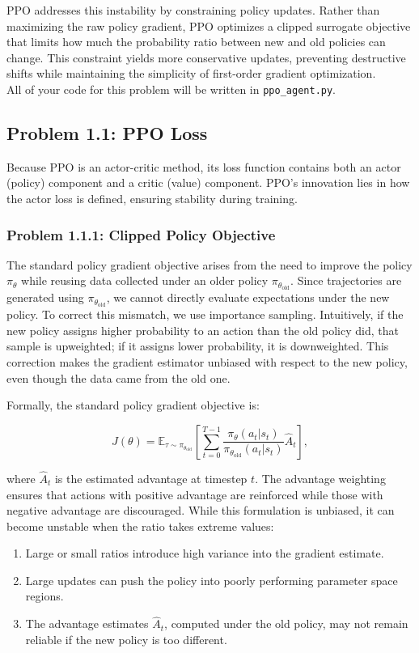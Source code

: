 \documentclass[12pt]{article}
\begin{document}
PPO addresses this instability by constraining policy updates. Rather than maximizing the raw policy gradient, PPO optimizes a clipped surrogate objective that limits how much the probability ratio between new and old policies can change. This constraint yields more conservative updates, preventing destructive shifts while maintaining the simplicity of first-order gradient optimization. \\
\noindent
All of your code for this problem will be written in \texttt{ppo\_agent.py}.

\subsection*{Problem 1.1: PPO Loss}

Because PPO is an actor-critic method, its loss function contains both an actor (policy) component and a critic (value) component. PPO’s innovation lies in how the actor loss is defined, ensuring stability during training.

\subsubsection*{Problem 1.1.1: Clipped Policy Objective}

The standard policy gradient objective arises from the need to improve the policy $\pi_\theta$ while reusing data collected under an older policy $\pi_{\theta_{\text{old}}}$. Since trajectories are generated using $\pi_{\theta_{\text{old}}}$, we cannot directly evaluate expectations under the new policy. To correct this mismatch, we use importance sampling. Intuitively, if the new policy assigns higher probability to an action than the old policy did, that sample is upweighted; if it assigns lower probability, it is downweighted. This correction makes the gradient estimator unbiased with respect to the new policy, even though the data came from the old one.  

Formally, the standard policy gradient objective is:

\begin{equation}
J(\theta) = \mathbb{E}_{\tau \sim \pi_{\theta_{\text{old}}}} \left[ \sum_{t=0}^{T-1} \frac{\pi_\theta(a_t|s_t)}{\pi_{\theta_{\text{old}}}(a_t|s_t)} \hat{A}_t \right],
\end{equation}

where $\hat{A}_t$ is the estimated advantage at timestep $t$. The advantage weighting ensures that actions with positive advantage are reinforced while those with negative advantage are discouraged. While this formulation is unbiased, it can become unstable when the ratio takes extreme values:
\begin{enumerate}
    \item Large or small ratios introduce high variance into the gradient estimate.
    \item Large updates can push the policy into poorly performing parameter space regions.
    \item The advantage estimates $\hat{A}_t$, computed under the old policy, may not remain reliable if the new policy is too different.
\end{enumerate}
\end{document}
